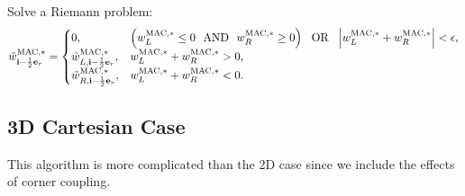 Solve a Riemann problem:
\begin{equation}
\tilde{w}_{{\bf i}-\frac{1}{2}{\bf e}_r}^{\rm MAC,*} =
\begin{cases}
0, & \left(w_L^{\rm MAC,*} \le 0 ~~ {\rm AND} ~~ w_R^{\rm MAC,*} \ge 0\right) ~~ {\rm OR} ~~ \left|w_L^{\rm MAC,*} + w_R^{\rm MAC,*}\right| < \epsilon, \\
\tilde{w}_{L,{\bf i}-\frac{1}{2}{\bf e}_r}^{\rm MAC,*}, & w_L^{\rm MAC,*} + w_R^{\rm MAC,*} > 0, \\
\tilde{w}_{R,{\bf i}-\frac{1}{2}{\bf e}_r}^{\rm MAC,*}, & w_L^{\rm MAC,*} + w_R^{\rm MAC,*} < 0. 
\end{cases}
\end{equation}

\newpage

\subsection{3D Cartesian Case}
This algorithm is more complicated than the 2D case since we include
the effects of corner coupling.

